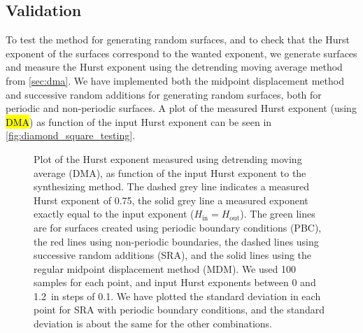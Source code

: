\subsection{Validation}
To test the method for generating random surfaces, and to check that the Hurst exponent of the surfaces correspond to the wanted exponent, we generate surfaces and measure the Hurst exponent using the detrending moving average method from \cref{sec:dma}. We have implemented both the midpoint displacement method and successive random additions for generating random surfaces, both for periodic and non-periodic surfaces. A plot of the measured Hurst exponent (using \hl{DMA}) as function of the input Hurst exponent can be seen in \cref{fig:diamond_square_testing}.%
%
\begin{figure}[!htb]%
    \centering%
    {
        \newcommand{\f}{\footnotesize}%
        \newcommand{\x}{\text}%
        \newcommand{\hh}{{\f $H_\x{in}=H_\x{out}$}}%
    }
    \caption[%
        Plot of the Hurst exponent measured using detrending moving average (DMA), as function of the input Hurst exponent to the synthesizing method. The dashed grey line indicates a measured Hurst exponent of 0.75, the solid grey line a measured exponent exactly equal to the input exponent ($H_\text{in} = H_\text{out}$). The green lines are for surfaces created using periodic boundary conditions (PBC), the red lines using non-periodic boundaries, the dashed lines using successive random additions (SRA), and the solid lines using the regular midpoint displacement method (MDM). We used 100 samples for each point, and input Hurst exponents between 0 and 1.2 in steps of 0.1. We have plotted the standard deviation in each point for SRA with periodic boundary conditions, and the standard deviation is about the same for the other combinations. %
    ]{%
        Plot of the Hurst exponent measured using detrending moving average (DMA), as function of the input Hurst exponent to the synthesizing method. The dashed grey line indicates a measured Hurst exponent of 0.75, the solid grey line a measured exponent exactly equal to the input exponent ($H_\text{in} = H_\text{out}$). The green lines are for surfaces created using periodic boundary conditions (PBC), the red lines using non-periodic boundaries, the dashed lines using successive random additions (SRA), and the solid lines using the regular midpoint displacement method (MDM). We used 100 samples for each point, and input Hurst exponents between 0 and 1.2\protect\footnotemark\ in steps of 0.1. We have plotted the standard deviation in each point for SRA with periodic boundary conditions, and the standard deviation is about the same for the other combinations. %
}
\end{figure}
